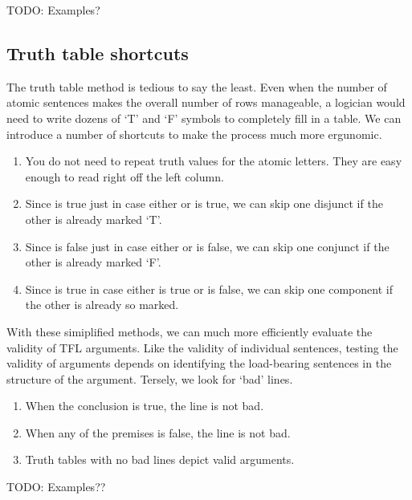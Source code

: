 TODO: Examples?

\subsection{Truth table shortcuts} \cite[][Chapter 14, pp. 97-101]{Mag25}

The truth table method is tedious to say the least. Even when the number of
atomic sentences makes the overall number of rows manageable, a logician would
need to write dozens of `T' and `F' symbols to completely fill in a table. We
can introduce a number of shortcuts to make the process much more ergunomic.

\begin{enumerate}
\item You do not need to repeat truth values for the atomic letters. They are
  easy enough to read right off the left column.
\item Since \ephi\eor\epsi is true just in case either \ephi or \epsi is true,
  we can skip one disjunct if the other is already marked `T'.
\item Since \ephi\eand\epsi is false just in case either \ephi or \epsi is
  false, we can skip one conjunct if the other is already marked `F'.
\item Since \ephi\eif\epsi is true in case either \epsi is true or \ephi is
  false, we can skip one component if the other is already so marked.
\end{enumerate}

With these simiplified methods, we can much more efficiently evaluate the
validity of TFL arguments. Like the validity of individual sentences, testing
the validity of arguments depends on identifying the load-bearing sentences
in the structure of the argument. Tersely, we look for `bad' lines.

\begin{enumerate}
\item When the conclusion is true, the line is not bad.
\item When any of the premises is false, the line is not bad.
\item Truth tables with no bad lines depict valid arguments.
\end{enumerate}

TODO: Examples??

